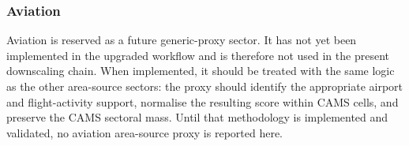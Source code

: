 \subsubsection{Aviation}
\label{sec:generic-aviation}

Aviation is reserved as a future generic-proxy sector. It has not yet
been implemented in the upgraded workflow and is therefore not used in
the present downscaling chain. When implemented, it should be treated
with the same logic as the other area-source sectors: the proxy should
identify the appropriate airport and flight-activity support, normalise
the resulting score within CAMS cells, and preserve the CAMS sectoral
mass. Until that methodology is implemented and validated, no aviation
area-source proxy is reported here.
